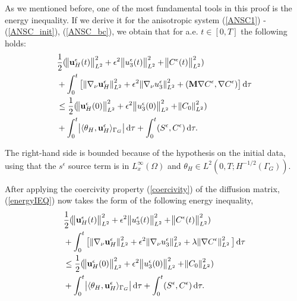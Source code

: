 \documentclass[11pt]{article}
\newcommand*\diff{\mathop{}\!\mathrm{d}}
\begin{document}
As we mentioned before, one of the most fundamental tools in this proof is the energy inequality. If we derive it for the anisotropic system (\ref{ANSC1}) - (\ref{ANSC_init}), (\ref{ANSC_bc}), we obtain that for a.e. $t \in [0,T]$ the following holds:
%
\begin{equation}
\begin{split}  
& \frac{1}{2} (\norm{\mathbf{u}_H^\epsilon (t)}_{L^2}^2 + \epsilon ^ 2 \norm{u_3^\epsilon (t)}_{L^2}^2 + \norm{C^\epsilon (t)}_{L^2}^2) \\
& + \int_0 ^ t \big[ \norm{\nabla_\nu \mathbf{u}_H^\epsilon}_{L^2}^2 + \epsilon ^ 2 \norm{\nabla_\nu u_3^\epsilon}_{L^2}^2  + (\mathbf{M} \nabla C^\epsilon, \nabla C^\epsilon) \big] \diff \tau \\
& \leq \frac{1}{2} (\norm{\mathbf{u}_H^\epsilon (0)}_{L^2}^2 + \epsilon ^ 2 \norm{u_3^\epsilon (0)}_{L^2}^2 + \norm{C_0}_{L^2}^2) \\
& + \int_0^t \abs{\langle \theta_H, \mathbf{u}^\epsilon_H \rangle_{\Gamma_G}} \diff \tau + \int_0^t (S^\epsilon,C^\epsilon) \diff \tau. \raisetag{60pt} \label{energyIEQ}
\end{split}
\end{equation}

The right-hand side is bounded because of the hypothesis on the initial data, using that the $s^\epsilon$ source term is in $L^\infty_x (\Omega)$ and $\theta_H \in L^2(0,T; H^{-1/2}(\Gamma_G))$.

After applying the coercivity property (\ref{coercivity}) of the diffusion matrix, (\ref{energyIEQ}) now takes the form of the following energy inequality,
%
\begin{equation}
\begin{split}  
& \frac{1}{2} (\norm{\mathbf{u}_H^\epsilon (t)}_{L^2}^2 + \epsilon ^ 2 \norm{u_3^\epsilon (t)}_{L^2}^2 + \norm{C^\epsilon (t)}_{L^2}^2) \\
& + \int_0 ^ t \big [\norm{\nabla_\nu \mathbf{u}_H^\epsilon}_{L^2}^2 + \epsilon ^ 2 \norm{\nabla_\nu u_3^\epsilon}_{L^2}^2 + \lambda \norm{\nabla C^\epsilon}_{L^2}^2 \big ] \diff \tau \\
& \leq \frac{1}{2} (\norm{\mathbf{u}_H^\epsilon (0)}_{L^2}^2 + \epsilon ^ 2 \norm{u_3^\epsilon (0)}_{L^2}^2 + \norm{C_0}_{L^2}^2) \\
& + \int_0^t \abs{\langle \theta_H, \mathbf{u}^\epsilon_H \rangle_{\Gamma_G}} \diff \tau + \int_0^t (S^\epsilon,C^\epsilon) \diff \tau. \raisetag{60pt} \label{finalformEIEQ}
\end{split}
\end{equation}
\end{document}
